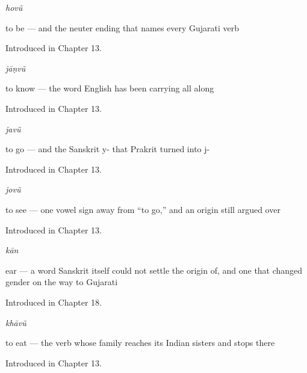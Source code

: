 \noindent\begin{minipage}[t]{\linewidth}
\raggedright
\textbf{}\enspace\emph{hovũ}\par
\small to be — and the neuter ending that names every Gujarati verb\par
\footnotesize Introduced in Chapter 13.
\end{minipage}\par\medskip

\noindent\begin{minipage}[t]{\linewidth}
\raggedright
\textbf{}\enspace\emph{jāṇvũ}\par
\small to know — the word English has been carrying all along\par
\footnotesize Introduced in Chapter 13.
\end{minipage}\par\medskip

\noindent\begin{minipage}[t]{\linewidth}
\raggedright
\textbf{}\enspace\emph{javũ}\par
\small to go — and the Sanskrit y- that Prakrit turned into j-\par
\footnotesize Introduced in Chapter 13.
\end{minipage}\par\medskip

\noindent\begin{minipage}[t]{\linewidth}
\raggedright
\textbf{}\enspace\emph{jovũ}\par
\small to see — one vowel sign away from “to go,” and an origin still argued over\par
\footnotesize Introduced in Chapter 13.
\end{minipage}\par\medskip

\noindent\begin{minipage}[t]{\linewidth}
\raggedright
\textbf{}\enspace\emph{kān}\par
\small ear — a word Sanskrit itself could not settle the origin of, and one that changed gender on the way to Gujarati\par
\footnotesize Introduced in Chapter 18.
\end{minipage}\par\medskip

\noindent\begin{minipage}[t]{\linewidth}
\raggedright
\textbf{}\enspace\emph{khāvũ}\par
\small to eat — the verb whose family reaches its Indian sisters and stops there\par
\footnotesize Introduced in Chapter 13.
\end{minipage}\par\medskip

